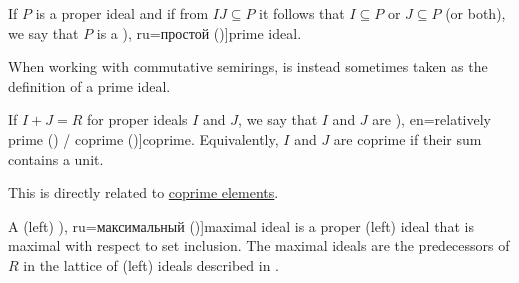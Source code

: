 \begin{definition}
\begin{thmenum}[resume=def:semiring_ideal]
     If \( P \) is a proper ideal and if from \( IJ \subseteq P \) it follows that \( I \subseteq P \) or \( J \subseteq P \) (or both), we say that \( P \) is a \term[bg=прост (\cite[7]{КоцевСидеров2016}), ru=простой (\cite[14]{ВечтомовПетров2022})]{prime ideal}.

    When working with commutative semirings,  is instead sometimes taken as the definition of a prime ideal.

     If \( I + J = R \) for proper ideals \( I \) and \( J \), we say that \( I \) and \( J \) are \term[bg=взаимно прости (\cite[18]{КоцевСидеров2016}), en=relatively prime (\cite[116]{Lang2002}) / coprime (\cite[205]{Birkhoff1948})]{coprime}. Equivalently, \( I \) and \( J \) are coprime if their sum contains a unit.

    This is directly related to \hyperref[def:coprime_elements]{coprime elements}.

     A (left) \term[bg=максимален (\cite[7]{КоцевСидеров2016}), ru=максимальный (\cite[13]{ВечтомовПетров2022})]{maximal ideal} is a proper (left) ideal that is maximal with respect to set inclusion. The maximal ideals are the predecessors of \( R \) in the lattice of (left) ideals described in .
  \end{thmenum}
\end{definition}

